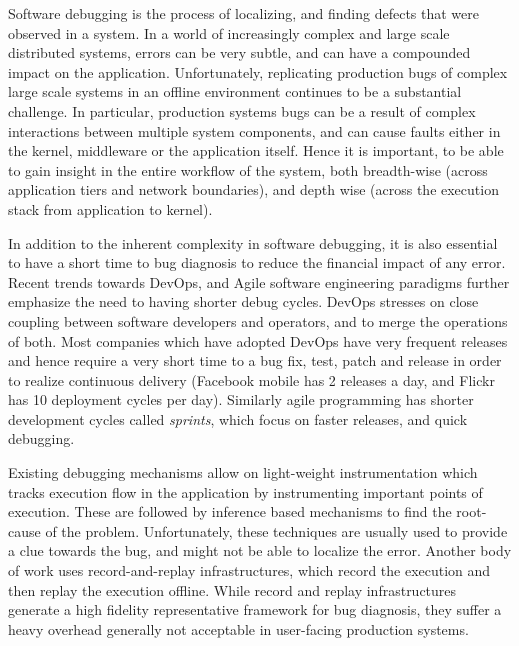 Software debugging is the process of localizing, and finding defects that were observed in a system.
In a world of increasingly complex and large scale distributed systems, errors can be very subtle, and can have a compounded impact on the application.
Unfortunately, replicating production bugs of complex large scale systems in an offline environment continues to be a substantial challenge.
In particular, production systems bugs can be a result of complex interactions between multiple system components, and can cause faults either in the kernel, middleware or the application itself.
Hence it is important, to be able to gain insight in the entire workflow of the system, both breadth-wise (across application tiers and network boundaries), and depth wise (across the execution stack from application to kernel).

In addition to the inherent complexity in software debugging, it is also essential to have a short time to bug diagnosis to reduce the financial impact of any error.
Recent trends towards DevOps\cite{devops}, and Agile\cite{agile} software engineering paradigms further emphasize the need to having shorter debug cycles.
DevOps stresses on close coupling between software developers and operators, and to merge the operations of both.
Most companies which have adopted DevOps have very frequent releases and hence require a very short time to a bug fix, test, patch and release in order to realize continuous delivery (Facebook mobile has 2 releases a day, and Flickr has 10 deployment cycles per day).
Similarly agile programming has shorter development cycles called \textit{sprints}, which focus on faster releases, and quick debugging.

Existing debugging mechanisms allow on light-weight instrumentation which tracks execution flow in the application by instrumenting important points of execution.
These are followed by inference based mechanisms to find the root-cause of the problem.
Unfortunately, these techniques are usually used to provide a clue towards the bug, and might not be able to localize the error.
Another body of work uses record-and-replay infrastructures, which record the execution and then replay the execution offline.
While record and replay infrastructures generate a high fidelity representative framework for bug diagnosis, they suffer a heavy overhead generally not acceptable in user-facing production systems.


